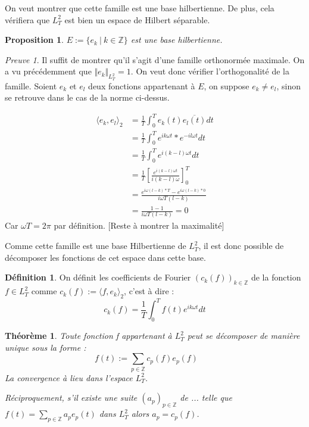 \documentclass[]{article}
\newtheorem{mythm}{Théorème}
\newtheorem{myproposition}{Proposition}
\theoremstyle{remark}
\newtheorem{myproof}{Preuve}
\theoremstyle{definition}
\newtheorem{mydef}{Définition}
\begin{document}
			
			On veut montrer que cette famille est une base hilbertienne. De plus, cela vérifiera que $L_T^2$ est bien un espace de Hilbert séparable. 
			
			\begin{myproposition}
				$E:= \{e_k~ \vert~ k \in \mathbb{Z} \}$ est une base hilbertienne.
			\end{myproposition}
			
			\begin{myproof}	
				
				Il suffit de montrer qu'il s'agit d'une famille orthonormée maximale.
				On a vu précédemment que $\Vert e_k\Vert_{L_T^2} = 1$. On veut donc vérifier l'orthogonalité de la famille. 
				Soient $e_k$ et $e_l$ deux fonctions appartenant à $E$, on suppose $e_k\ne e_l$, sinon se retrouve dans le cas de la norme ci-dessus.  
				
				\begin{align*}
				\langle e_k, e_l\rangle_2 & = \frac{1}{T} \int_0^T e_k(t) \overline{e_l(t)}dt 
				\\ & = \frac{1}{T} \int_0^T e^{ik\omega t} * e^{-il\omega t} dt 
				\\ & = \frac{1}{T} \int_0^T e^{i(k-l)\omega t} dt 
				\\ & = \frac{1}{T}  \left[ \frac {e^{i(k-l)\omega t}} {{i(k-l)\omega}} \right] _0^T
				\\ & = \frac {e^{i\omega (l-k)*T} - e^{i\omega(l-k) * 0}} {i\omega T(l-k)}
				\\ & = \frac {1 - 1}{i\omega T(l-k)} = 0
				\end{align*}
				Car $\omega T = 2\pi$ par définition.
				[Reste à montrer la maximalité]
				
				
			\end{myproof}
			
		Comme cette famille est une base Hilbertienne de $L_T^2$, il est donc possible de décomposer les fonctions de cet espace dans cette base. 
			\begin{mydef}
				On définit les coefficients de Fourier $\left(c_k(f)\right)_{k \in \mathbb{Z}} $ de la fonction  $ f \in L_T^2 $ comme $ c_k(f) := \langle f, e_k\rangle_2$, c'est à dire : 
					$$ c_k(f) = \frac{1}{T}\int_{0}^{T} f(t) e^{ik\omega t}dt $$
			\end{mydef}
			
			\begin{mythm}
				Toute fonction f appartenant à $L^2_T$ peut se décomposer de manière unique sous la forme : 
				$$f(t):= \sum_{p \in \mathbb{Z}} c_p(f)e_p(f) \qquad $$
				La convergence à lieu dans l'espace $L^2_T$.
				
				Réciproquement, s'il existe une suite $(a_p)_{p \in \mathbb{Z}}$ de  ... telle que $f(t) = \sum_{p\in \mathbb{Z}}a_p e_p(t)$ dans $L^2_T$ alors $a_p=c_p(f)$.
			\end{mythm}
			
\end{document}
